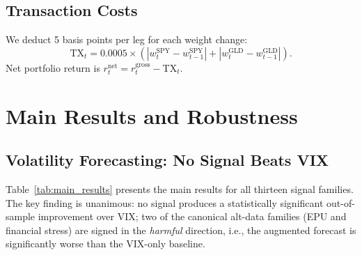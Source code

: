 \documentclass[12pt,a4paper]{article}
\begin{document}
\subsection{Transaction Costs}

We deduct 5 basis points per leg for each weight change:
\begin{equation}
\text{TX}_t = 0.0005 \times \left(|w_t^{\text{SPY}} - w_{t-1}^{\text{SPY}}| + |w_t^{\text{GLD}} - w_{t-1}^{\text{GLD}}|\right).
\label{eq:tx}
\end{equation}
Net portfolio return is $r_t^{\text{net}} = r_t^{\text{gross}} - \text{TX}_t$.


\section{Main Results and Robustness}
\label{sec:results}

\subsection{Volatility Forecasting: No Signal Beats VIX}

Table~\ref{tab:main_results} presents the main results for all thirteen signal families. The key finding is unanimous: no signal produces a statistically significant out-of-sample improvement over VIX; two of the canonical alt-data families (EPU and financial stress) are signed in the \emph{harmful} direction, i.e., the augmented forecast is significantly worse than the VIX-only baseline.
\end{document}
